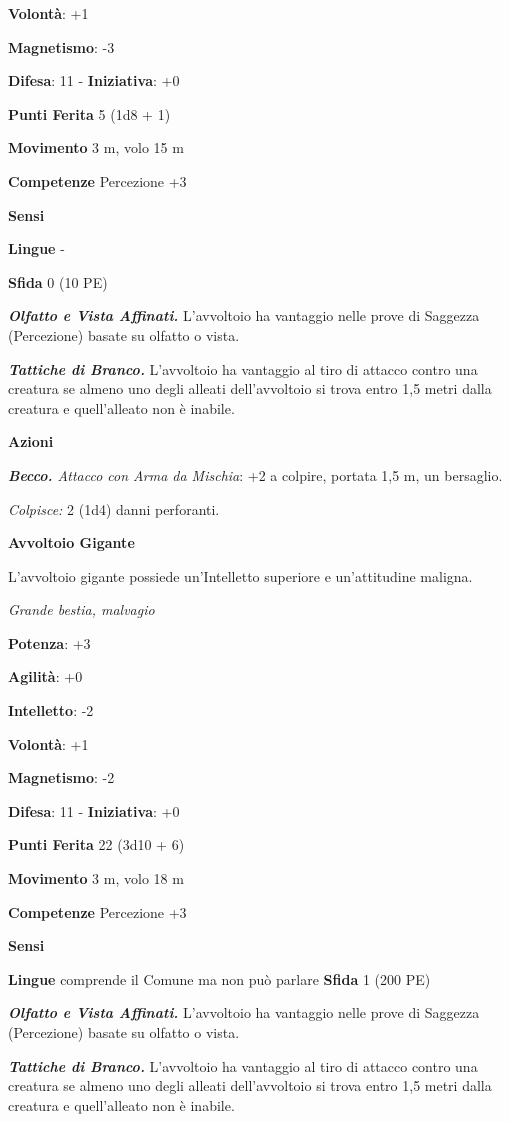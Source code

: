 \begin{multicols}{2}
\textbf{Volontà}: +1

\textbf{Magnetismo}: -3

\textbf{Difesa}: 11 - \textbf{Iniziativa}: +0

\textbf{Punti Ferita} 5 (1d8 + 1)

\textbf{Movimento} 3 m, volo 15 m

\textbf{Competenze} Percezione +3

\textbf{Sensi} 

\textbf{Lingue} -

\textbf{Sfida} 0 (10 PE)

\emph{\textbf{Olfatto e Vista Affinati.}} L'avvoltoio ha vantaggio nelle
prove di Saggezza (Percezione) basate su olfatto o vista.

\emph{\textbf{Tattiche di Branco.}} L'avvoltoio ha vantaggio al tiro di
attacco contro una creatura se almeno uno degli alleati dell'avvoltoio
si trova entro 1,5 metri dalla creatura e quell'alleato non è inabile.

\textbf{Azioni}

\emph{\textbf{Becco.} Attacco con Arma da Mischia}: +2 a colpire,
portata 1,5 m, un bersaglio.

\emph{Colpisce:} 2 (1d4) danni perforanti.

\textbf{Avvoltoio Gigante}

L'avvoltoio gigante possiede un'Intelletto superiore e un'attitudine
maligna.

\emph{Grande bestia, malvagio}

\textbf{Potenza}: +3

\textbf{Agilità}: +0

\textbf{Intelletto}: -2

\textbf{Volontà}: +1

\textbf{Magnetismo}: -2

\textbf{Difesa}: 11 - \textbf{Iniziativa}: +0

\textbf{Punti Ferita} 22 (3d10 + 6)

\textbf{Movimento} 3 m, volo 18 m

\textbf{Competenze} Percezione +3

\textbf{Sensi} 

\textbf{Lingue} comprende il Comune ma non può parlare \textbf{Sfida} 1
(200 PE)

\emph{\textbf{Olfatto e Vista Affinati.}} L'avvoltoio ha vantaggio nelle
prove di Saggezza (Percezione) basate su olfatto o vista.

\emph{\textbf{Tattiche di Branco.}} L'avvoltoio ha vantaggio al tiro di
attacco contro una creatura se almeno uno degli alleati dell'avvoltoio
si trova entro 1,5 metri dalla creatura e quell'alleato non è inabile.


\end{multicols}
